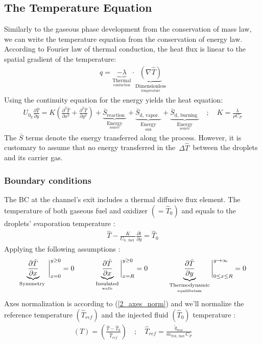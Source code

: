 \documentclass[12pt]{article}
\newcommand\tab[1][1cm]{\hspace*{#1}}
\numberwithin{equation}{section}
\begin{document}
\begin{flushleft}
\subsection{The Temperature Equation}

Similarly to the gaseous phase development from the conservation of mass law, we can write
the temperature equation from the conservation of energy law. According to Fourier law of thermal conduction, the heat flux is linear to the spatial gradient of the temperature:
\begin{align}
q=\underbrace{-\lambda}_{   \underset{\text {conduction}}{\text {Thermal}}} \cdot
\underbrace{(\nabla \hat{T})}_{   \underset{\text {temperature}}{\text {Dimensionless}}}
\end{align}
Using the continuity equation for the energy yields the heat equation:
\begin{align}
U_{0_{g}} \frac{\partial \hat{T}}{\partial y}=K\left(\frac{\partial^{2} \hat{T}}{\partial x^{2}}+\frac{\partial^{2} \hat{T}}{\partial y^{2}}\right)+
\underbrace{\bar{S}_{\text {reaction }}}_{ \underset{\text {source}}{\text {Energy}}}+
\underbrace{ \bar{S}_{\text {d, vapor. }} }_{ \underset{\text {sink}}{\text {Energy}}}+
\underbrace{ \bar{S}_{\text {d, burning }} }_{ \underset{\text {source}}{\text {Energy}}} \quad ; \quad K=\frac{\lambda}{\rho C_{P}}
\end{align}
The $\bar{S}$ terms denote the energy transferred along the process. However, it is customary to assume that no energy transferred in the \,$\Delta \hat{T}$\, between the droplets and its carrier gas.

\subsubsection{Boundary conditions}
The BC at the channel's exit includes a thermal diffusive flux element. The temperature of both gaseous fuel and oxidizer $(=\hat{T}_{0} )$ and equals to the droplets' evaporation temperature :
\begin{align}
\hat{T}-\frac{K}{U_{0, \text { fuel }}} \frac{\partial \hat{t}}{\partial y}=\hat{T}_{0}
\end{align}
Applying the following assumptions :
\begin{align}
\underbrace{\frac{\partial \hat{T}}{\partial x}}_{\text {Symmetry }} \bigg|_{x=0} ^{y \geq 0}=0 \tab \underbrace{\frac{\partial \hat{T}}{\partial x}}_{  \underset{\text {walls}}{\text{Insulated}} } \bigg|_{x=R}^{y \geq 0}= 0 \tab \underbrace{\frac{\partial \hat{T}}{\partial y}}_{  \underset{\text {equilibrium}}{\text{Thermodynamic}} }\bigg|_{0 \leq x \leq R}^{y \rightarrow \infty}=0
\end{align}
Axes normalization is according to (\ref{2_axes_norm}) and we'll normalize the reference temperature $\left(\hat{T}_{ref}\right)$ and the injected fluid $\left(\hat{T}_{0}\right)$ temperature :
\begin{align}
(T)=\left(\frac{\hat{T}-\hat{T}_{0}}{\hat{T}_{r e f}}\right) \quad ; \quad \hat{T}_{ref}=\frac{\tilde{q}_{\text{reac}}}{m_{ \text{Tot, fuel}}\, C_{P}}
\end{align}


\end{flushleft}
\end{document}
